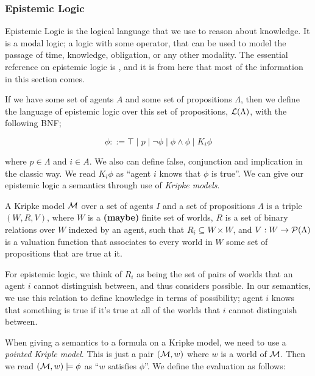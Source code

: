 \documentclass[12pt, a4paper]{article}
\begin{document}
\subsubsection{Epistemic Logic}

Epistemic Logic is the logical language that we use to reason about knowledge.
It is a modal logic; a logic with some operator, that can be used to model the
passage of time, knowledge, obligation, or any other modality. The essential
reference on epistemic logic is \cite{ReasoningAboutKnowledge}, and it is from
here that most of the information in this section comes. 
  
If we have some set of agents $A$ and some set of propositions $\Lambda$, then
we define the language of epistemic logic over this set of propositions,
$\mathcal{L}(\Lambda)$, with the following BNF;


\begin{equation*}
  \phi ::= \top \mid p \mid \neg \phi \mid \phi \land \phi \mid K_i \phi
\end{equation*}

\noindent where $p \in \Lambda$ and $i \in A$. We also can define false, conjunction and
implication in the classic way. We read $K_i \phi$ as ``agent $i$ knows that
$\phi$ is true''. We can give our epistemic logic a semantics through use of
\textit{Kripke models}. 

\bigskip

A Kripke model $\mathcal{M}$ over a set of agents $I$ and a set of propositions
$\Lambda$ is a triple $(W, R, V)$, where $W$ is a \textbf{(maybe)} finite set of
worlds, $R$ is a set of binary relations over $W$ indexed by an agent, such that
$R_i \subseteq W \times W$, and $V : W \rightarrow \mathcal{P}(\Lambda)$ is a
valuation function that associates to every world in $W$ some set of
propositions that are true at it.

For epistemic logic, we think of $R_i$ as being the set of pairs of worlds that
an agent $i$ cannot distinguish between, and thus considers possible. In our
semantics, we use this relation to define knowledge in terms of possibility;
agent $i$ knows that something is true if it's true at all of the worlds that
$i$ cannot distinguish between.

\bigskip

When giving a semantics to a formula on a Kripke model, we need to use a
\textit{pointed Kriple model}. This is just a pair $(\mathcal{M}, w)$ where $w$ is a
world of $\mathcal{M}$. Then we read $(\mathcal{M}, w) \models \phi$ as ``$w$ satisfies
$\phi$''. We define the evaluation as follows:
\end{document}
